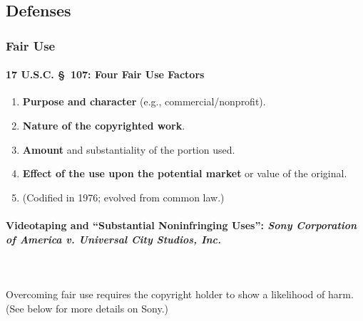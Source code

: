\subsection{Defenses}

\subsubsection{Fair Use}

\paragraph{17 U.S.C. \S\ 107: Four Fair Use Factors}

\begin{enumerate}
    \item \textbf{Purpose and character} (e.g., commercial/nonprofit).
    \item \textbf{Nature of the copyrighted work}.
    \item \textbf{Amount} and substantiality of the portion used.
    \item \textbf{Effect of the use upon the potential market} or value of the 
    original.
    \item (Codified in 1976; evolved from common law.)
\end{enumerate}

\paragraph{Videotaping and ``Substantial Noninfringing Uses'': \emph{Sony 
Corporation of America v.  Universal City Studios, Inc.}}
~\\\\
Overcoming fair use requires the copyright holder to show a likelihood of 
harm. (See below for more details on Sony.)

